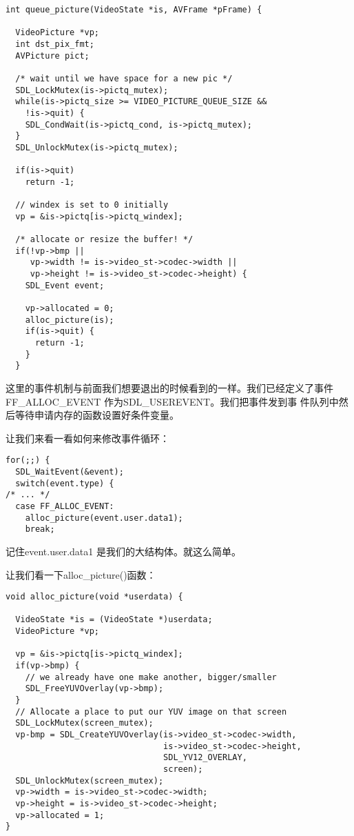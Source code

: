 \begin{lstlisting}
int queue_picture(VideoState *is, AVFrame *pFrame) {

  VideoPicture *vp;
  int dst_pix_fmt;
  AVPicture pict;

  /* wait until we have space for a new pic */
  SDL_LockMutex(is->pictq_mutex);
  while(is->pictq_size >= VIDEO_PICTURE_QUEUE_SIZE &&
    !is->quit) {
    SDL_CondWait(is->pictq_cond, is->pictq_mutex);
  }
  SDL_UnlockMutex(is->pictq_mutex);

  if(is->quit)
    return -1;

  // windex is set to 0 initially
  vp = &is->pictq[is->pictq_windex];

  /* allocate or resize the buffer! */
  if(!vp->bmp ||
     vp->width != is->video_st->codec->width ||
     vp->height != is->video_st->codec->height) {
    SDL_Event event;

    vp->allocated = 0;
    alloc_picture(is);
    if(is->quit) {
      return -1;
    }
  }
\end{lstlisting}

这里的事件机制与前面我们想要退出的时候看到的一样。我们已经定义了事件FF_ALLOC_EVENT 作为SDL_USEREVENT。我们把事件发到事 件队列中然后等待申请内存的函数设置好条件变量。

让我们来看一看如何来修改事件循环：
\begin{lstlisting}
for(;;) {
  SDL_WaitEvent(&event);
  switch(event.type) {
/* ... */
  case FF_ALLOC_EVENT:
    alloc_picture(event.user.data1);
    break;
\end{lstlisting}

记住event.user.data1 是我们的大结构体。就这么简单。

让我们看一下alloc_picture()函数：

\begin{lstlisting}
void alloc_picture(void *userdata) {
  
  VideoState *is = (VideoState *)userdata;
  VideoPicture *vp;

  vp = &is->pictq[is->pictq_windex];
  if(vp->bmp) {
    // we already have one make another, bigger/smaller
	SDL_FreeYUVOverlay(vp->bmp);
  }
  // Allocate a place to put our YUV image on that screen
  SDL_LockMutex(screen_mutex);
  vp-bmp = SDL_CreateYUVOverlay(is->video_st->codec->width,
                                is->video_st->codec->height,
								SDL_YV12_OVERLAY,
								screen);
  SDL_UnlockMutex(screen_mutex);
  vp->width = is->video_st->codec->width;
  vp->height = is->video_st->codec->height;
  vp->allocated = 1;
}
\end{lstlisting}

